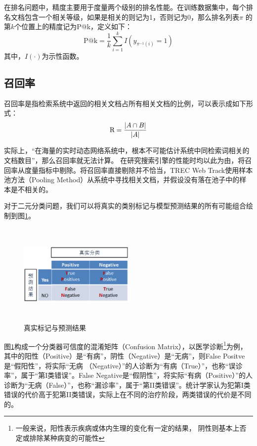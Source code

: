 在排名问题中，精度主要用于度量两个级别的排名性能。在训练数据集中，每个排名文档包含一个相关等级，如果是相关的则记为1，否则记为0，那么排名列表$\pi$ 的第$k$个位置上的精度记为P@k，定义如下：
\begin{equation}\label{eq:precisionk}
    \text{P@k}=\frac{1}{k} \sum_{i=1}^{k}{I(y_{\pi^{-1}(i)}=1)}
\end{equation}
其中，$I(\cdot)$为示性函数。

\subsection{召回率}
召回率是指检索系统中返回的相关文档占所有相关文档的比例，可以表示成如下形式：
\begin{equation}\label{eq:recall}
    \text R = \frac{|A\cap B|}{|A|}
\end{equation}

实际上，“在海量的实时动态网络系统中，根本不可能估计系统中同检索词相关的文档数目”\cite{chu1996search}，那么召回率就无法计算。
\cite{chu1996search,gwizdka1999towards}在研究搜索引擎的性能时均以此为由，将召回率从度量指标中剔除。将召回率直接剔除并不恰当，TREC Web Track使用样本池方法（Pooling Method）从系统中寻找相关文档，并假设没有落在池子中的样本是不相关的\cite{voorhees2001overview}。

对于二元分类问题，我们可以将真实的类别标记与模型预测结果的所有可能组合绘制到图\ref{fig:labelandpredict}。
\begin{figure}[htbp]
  \centering
  \includegraphics[width=0.5\textwidth, height = 5cm]{figures/labelandpredict.eps}
  \caption{真实标记与预测结果}\label{fig:labelandpredict}
\end{figure}
图\ref{fig:labelandpredict}构成一个分类器可信度的混淆矩阵（Confusion Matrix），以医学诊断\footnote{一般来说，阳性表示疾病或体内生理的变化有一定的结果，
阴性则基本上否定或排除某种病变的可能性}为例，其中的阳性（Positive）是“有病”，阴性（Negative）是“无病”，则False Positve是“假阳性”，将实际“无病
（Negative）”的人诊断为“有病（True）”，也称“误诊率”，属于“第I类错误”。False Negative是“假阴性”，将实际“有病（Positive）”的人诊断为“无病（False）”，也称“漏诊率”，属于“第II类错误”。统计学家认为犯第I类错误的代价高于犯第II类错误，实际上在不同的治疗阶段，两类错误的代价是不同的。

